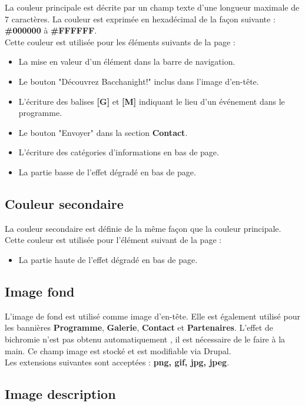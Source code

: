\documentclass[11pt]{report}
\begin{document}
La couleur principale est décrite par un champ texte d'une longueur maximale de
7 caractères. La couleur est exprimée en hexadécimal de la façon suivante :
\textbf{\#000000} à \textbf{\#FFFFFF}. \\
Cette couleur est utilisée pour les éléments suivants de la page :
\begin{itemize}
	\item La mise en valeur d'un élément dans la barre de navigation.
	\item Le bouton "Découvrez Bacchanight!" inclus dans l'image d'en-tête.
	\item L'écriture des balises \textbf{[G]} et \textbf{[M]} indiquant le lieu d'un événement dans le programme.
	\item Le bouton "Envoyer" dans la section \textbf{Contact}.
	\item L'écriture des catégories d'informations en bas de page.
	\item La partie basse de l'effet dégradé en bas de page.
\end{itemize}

\subsection{Couleur secondaire}

La couleur secondaire est définie de la même façon que la couleur principale.
Cette couleur est utilisée pour l'élément suivant de la page :
\begin{itemize}
	\item La partie haute de l'effet dégradé en bas de page.
\end{itemize}

\subsection{Image fond}

L'image de fond est utilisé comme image d'en-tête. Elle est également utilisé
pour les bannières \textbf{Programme}, \textbf{Galerie}, \textbf{Contact} et
\textbf{Partenaires}. L'effet de bichromie n'est pas obtenu automatiquement , il
est nécessaire de le faire à la main.
Ce champ image est stocké et est modifiable via Drupal. \\
Les extensions suivantes sont acceptées : \textbf{png, gif, jpg, jpeg}.

\subsection{Image description}
\end{document}
